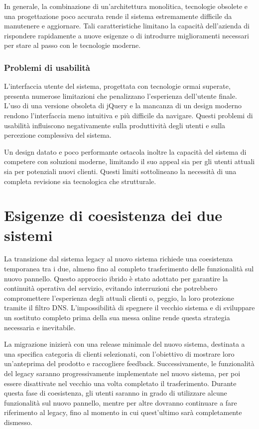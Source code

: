 In generale, la combinazione di un'architettura monolitica, tecnologie obsolete e una progettazione poco accurata rende il sistema estremamente difficile da manutenere e aggiornare. Tali caratteristiche limitano la capacità dell'azienda di rispondere rapidamente a nuove esigenze o di introdurre miglioramenti necessari per stare al passo con le tecnologie moderne.

\subsubsection{Problemi di usabilità}
L'interfaccia utente del sistema, progettata con tecnologie ormai superate, presenta numerose limitazioni che penalizzano l’esperienza dell’utente finale. L’uso di una versione obsoleta di jQuery e la mancanza di un design moderno rendono l’interfaccia meno intuitiva e più difficile da navigare. Questi problemi di usabilità influiscono negativamente sulla produttività degli utenti e sulla percezione complessiva del sistema.

Un design datato e poco performante ostacola inoltre la capacità del sistema di competere con soluzioni moderne, limitando il suo appeal sia per gli utenti attuali sia per potenziali nuovi clienti. Questi limiti sottolineano la necessità di una completa revisione sia tecnologica che strutturale.

\section{Esigenze di coesistenza dei due sistemi}

La transizione dal sistema legacy al nuovo sistema richiede una coesistenza temporanea tra i due, almeno fino al completo trasferimento delle funzionalità sul nuovo pannello. Questo approccio ibrido è stato adottato per garantire la continuità operativa del servizio, evitando interruzioni che potrebbero compromettere l’esperienza degli attuali clienti o, peggio, la loro protezione tramite il filtro DNS. L’impossibilità di spegnere il vecchio sistema e di sviluppare un sostituto completo prima della sua messa online rende questa strategia necessaria e inevitabile.

La migrazione inizierà con una release minimale del nuovo sistema, destinata a una specifica categoria di clienti selezionati, con l’obiettivo di mostrare loro un’anteprima del prodotto e raccogliere feedback. Successivamente, le funzionalità del legacy saranno progressivamente implementate nel nuovo sistema, per poi essere disattivate nel vecchio una volta completato il trasferimento. Durante questa fase di coesistenza, gli utenti saranno in grado di utilizzare alcune funzionalità sul nuovo pannello, mentre per altre dovranno continuare a fare riferimento al legacy, fino al momento in cui quest’ultimo sarà completamente dismesso.

